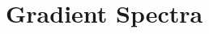 \documentclass[
  journal=pasa,
  manuscript=research-paper, %
  year=2021,
  volume=37,
]{cup-journal}
\begin{document}




\appendix

\section{Gradient Spectra}

\newpage
\end{document}
